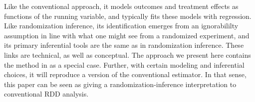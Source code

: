 \documentclass[12pt]{article}
\begin{document}
Like the conventional approach, it models outcomes and treatment
effects as functions of the running variable, and typically fits these
models with regression.
Like randomization inference, its identification emerges from an
ignorabililty assumption in line with what one might see from a
randomized experiment, and its primary inferential tools are the same
as in randomization inference.
These links are technical, as well as conceptual.
The approach we present here contains the method
in \citet{rocio} as a special case.
Further, with certain modeling and inferential choices, it will
reproduce a version of the conventional estimator.
In that sense, this paper can be seen as giving a
randomization-inference interpretation to conventional RDD analysis.

\begin{comment}
In particular, a straightforward randomization inference approach to
RDDs would argue that for a subset of subjects whose $R$ values
fell close to the cutoff, treatment  was effectively assigned randomly.
Then, as some researchers \citep[eg.][]{black2005evaluating, rocio,fan}\footnote{\citet{black2005evaluating}
  refers to its simple experimental approach as a ``Wald
  estimator.''} argue, analysts may use randomization inference
techniques to estimate and infer average treatment effects for this
small group of students.

Alternatively, the conventional approach, which
\citet{lee2008randomized} recommends, argues that one would expect
outcomes to correlate with the running variable---a relationship that
can be captured in a regression line.
If treatment had an effect, one would expect this relationship to jump
at the cutoff.
By measuring the size of the  discontinuity, researchers can quantify
the effect of the treatment on the outcome of interest.


This paper proposes a dual approach, combining randomization inference
and regression adjustment.
\end{comment}
\end{document}
